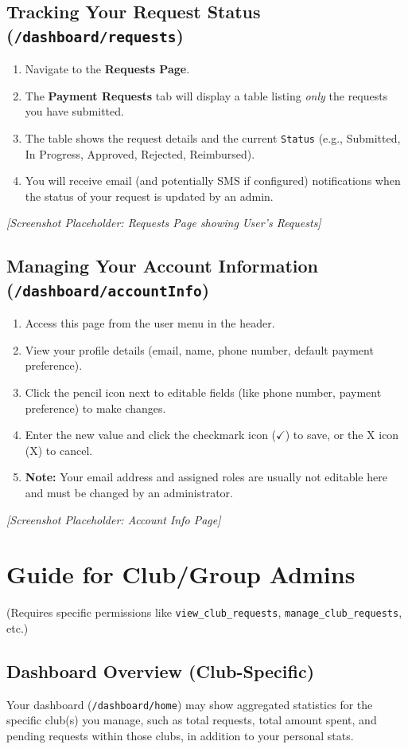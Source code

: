 \documentclass{article}
\begin{document}
\subsection{Tracking Your Request Status (\texttt{/dashboard/requests})}
\begin{enumerate}
    \item Navigate to the \textbf{Requests Page}.
    \item The \textbf{Payment Requests} tab will display a table listing \textit{only} the requests you have submitted.
    \item The table shows the request details and the current \texttt{Status} (e.g., Submitted, In Progress, Approved, Rejected, Reimbursed).
    \item You will receive email (and potentially SMS if configured) notifications when the status of your request is updated by an admin.
\end{enumerate}
\textit{[Screenshot Placeholder: Requests Page showing User's Requests]}

\subsection{Managing Your Account Information (\texttt{/dashboard/accountInfo})}
\begin{enumerate}
    \item Access this page from the user menu in the header.
    \item View your profile details (email, name, phone number, default payment preference).
    \item Click the pencil icon next to editable fields (like phone number, payment preference) to make changes.
    \item Enter the new value and click the checkmark icon ($\checkmark$) to save, or the X icon (\textsf{X}) to cancel.
    \item \textbf{Note:} Your email address and assigned roles are usually not editable here and must be changed by an administrator.
\end{enumerate}
\textit{[Screenshot Placeholder: Account Info Page]}

\section{Guide for Club/Group Admins}
(Requires specific permissions like \texttt{view\_club\_requests}, \texttt{manage\_club\_requests}, etc.)

\subsection{Dashboard Overview (Club-Specific)}
Your dashboard (\texttt{/dashboard/home}) may show aggregated statistics for the specific club(s) you manage, such as total requests, total amount spent, and pending requests within those clubs, in addition to your personal stats.
\end{document}
